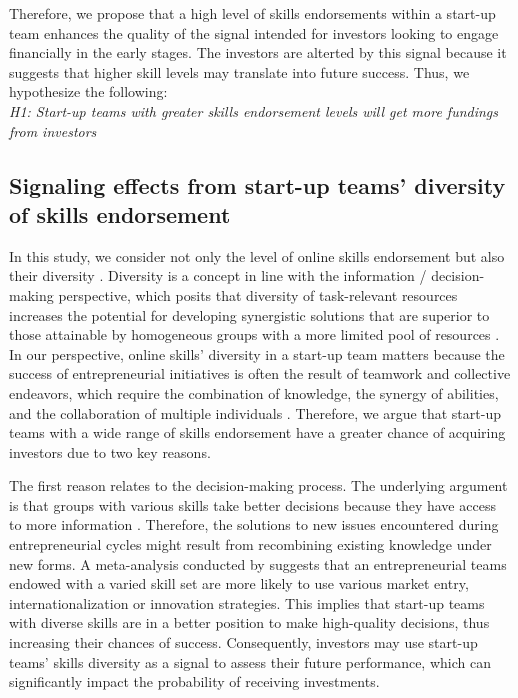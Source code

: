 \documentclass[12pt]{article}
\begin{document}
Therefore, we propose that a high level of skills endorsements within a start-up team enhances the quality of the signal intended for investors looking to engage financially in the early stages. The investors are alterted by this signal because it suggests that higher skill levels may translate into future success. Thus, we hypothesize the following: \\

\noindent \textit{H1: Start-up teams with greater skills endorsement levels will get more fundings from investors}

\subsection{Signaling effects from start-up teams' diversity of skills endorsement}

In this study, we consider not only the level of online skills endorsement but also their diversity \citep{harrison2007s, sundermeier2022entrepreneurial}. Diversity is a concept in line with the information / decision-making perspective, which posits that diversity of task-relevant resources increases the potential for developing synergistic solutions that are superior to those attainable by homogeneous groups with a more limited pool of resources \citep{williamsky1998demographyand}. In our perspective, online skills' diversity in a start-up team matters because the success of entrepreneurial initiatives is often the result of teamwork and collective endeavors, which require the combination of knowledge, the synergy of abilities, and the collaboration of multiple individuals \citep{klotz2014new}. Therefore, we argue that start-up teams with a wide range of skills endorsement have a greater chance of acquiring investors due to two key reasons.

The first reason relates to the decision-making process. The underlying argument is that groups with various skills take better decisions because they have access to more information \citep{hong2001problem}. Therefore, the solutions to new issues encountered during entrepreneurial cycles might result from recombining existing knowledge under new forms. A meta-analysis conducted by \citet{jin2017entrepreneurial} suggests that an entrepreneurial teams endowed with a varied skill set are more likely to use various market entry, internationalization or innovation strategies. This implies that start-up teams with diverse skills are in a better position to make high-quality decisions, thus increasing their chances of success. Consequently, investors may use start-up teams' skills diversity as a signal to assess their future performance, which can significantly impact the probability of receiving investments.
\end{document}
